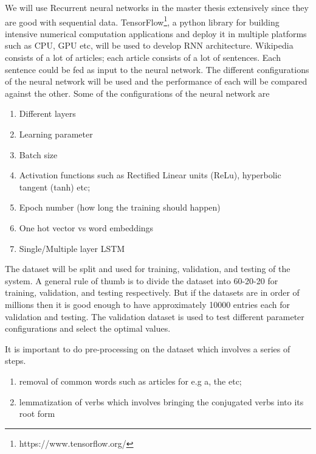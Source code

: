 \documentclass[a4paper, 11pt]{article}
\begin{document}
We will use  Recurrent neural networks in the master thesis extensively since they are good with sequential data. TensorFlow\footnote{https://www.tensorflow.org/}, a python library for building intensive numerical computation applications and deploy it in multiple platforms such as CPU, GPU etc, will be used to develop RNN architecture. Wikipedia consists of a lot of articles; each article consists of a lot of sentences. Each sentence could be fed as input to the neural network. The different configurations of the neural network will be used and the performance of each will be compared against the other. Some of the configurations of the neural network are

\begin{enumerate}
\item Different layers
\item Learning parameter 
\item Batch size 
\item Activation functions such as Rectified Linear units (ReLu), hyperbolic tangent (tanh) etc; 
\item Epoch number (how long the training should happen)
\item One hot vector vs word embeddings
\item Single/Multiple layer LSTM
\end{enumerate}

The dataset will be split and used for training, validation, and testing of the system. A general rule of thumb is to divide the dataset into 60-20-20 for training, validation, and testing respectively. But if the datasets are in order of millions then it is good enough to have approximately 10000 entries each for validation and testing. The validation dataset is used to test different parameter configurations and select the optimal values.

It is important to do pre-processing on the dataset which involves a series of steps.
\begin{enumerate}
\item removal of common words such as articles for e.g a, the etc; 
\item lemmatization of verbs which involves bringing the conjugated verbs into its root form 
\end{enumerate}
\end{document}
